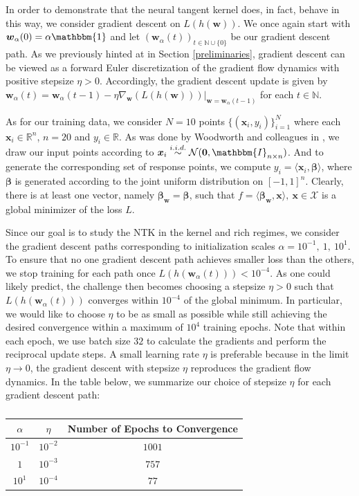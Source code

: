 \documentclass{article}
\begin{document}
In order to demonstrate that the neural tangent kernel does, in fact, behave in this way, we consider gradient descent on $L(h(\boldsymbol{w}))$. We once again start with $\boldsymbol{w}_{\alpha}(0) = \alpha \mathbbm{1}$ and let $(\boldsymbol{w}_{\alpha}(t))_{t \in \mathbb{N} \cup \{ 0\}}$ be our gradient descent path. As we previously hinted at in Section \ref{preliminaries}, gradient descent can be viewed as a forward Euler discretization of the gradient flow dynamics with positive stepsize $\eta > 0$. Accordingly, the gradient descent update is given by $\boldsymbol{w}_{\alpha}(t) = \boldsymbol{w}_{\alpha}(t-1) - \eta \nabla_{\boldsymbol{w}} (L(h(\boldsymbol{w})))|_{\boldsymbol{w} = \boldsymbol{w}_{\alpha}(t-1)}$ for each $t \in \mathbb{N}$.

As for our training data, we consider $N=10$ points $\{ (\boldsymbol{x}_i, y_i) \}_{i=1}^N$ where each $\boldsymbol{x}_i \in \mathbb{R}^{n}$, $n = 20$ and $y_i \in \mathbb{R}$. As was done by Woodworth and colleagues in \cite{woodworth2020kernel}, we draw our input points according to $\boldsymbol{x}_i \overset{i.i.d.}{\sim} \mathcal{N}(\boldsymbol{0}, \mathbbm{I}_{n \times n})$. And to generate the corresponding set of response points, we compute $y_i = \langle \boldsymbol{x}_i, \boldsymbol{\beta} \rangle$, where $\boldsymbol{\beta}$ is generated according to the joint uniform distribution on $[-1, 1]^n$. Clearly, there is at least one vector, namely $\boldsymbol{\beta}_{\boldsymbol{w}} = \boldsymbol{\beta}$, such that $f = \langle \boldsymbol{\beta}_{\boldsymbol{w}}, \boldsymbol{x} \rangle, \ \boldsymbol{x} \in \mathcal{X}$ is a global minimizer of the loss $L$.

Since our goal is to study the NTK in the kernel and rich regimes, we consider the gradient descent paths corresponding to initialization scales $\alpha = 10^{-1}, \ 1, \ 10^{1}$. To ensure that no one gradient descent path achieves smaller loss than the others, we stop training for each path once $L(h(\boldsymbol{w}_{\alpha}(t))) < 10^{-4}$. As one could likely predict, the challenge then becomes choosing a stepsize $\eta > 0$ such that $L(h(\boldsymbol{w}_{\alpha}(t)))$ converges within $10^{-4}$ of the global minimum. In particular, we would like to choose $\eta$ to be as small as possible while still achieving the desired convergence within a maximum of $10^4$ training epochs. Note that within each epoch, we use batch size $32$ to calculate the gradients and perform the reciprocal update steps. A small learning rate $\eta$ is preferable because in the limit $\eta \rightarrow 0$, the gradient descent with stepsize $\eta$ reproduces the gradient flow dynamics. In the table below, we summarize our choice of stepsize $\eta$ for each gradient descent path:
\begin{table}[H]
\centering
\begin{tabular}{ c|c|c } 
$\alpha$ & $\eta$ & Number of Epochs to Convergence \\
\hline
$10^{-1}$ & $10^{-2}$ & $1001$ \\ 
$1$ & $10^{-3}$ & $757$ \\
$10^1$ & $10^{-4}$ & $77$
\end{tabular}
\caption{}\label{table:NTK}
\end{table}
\end{document}
